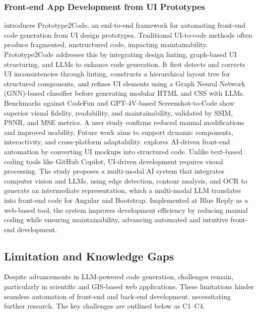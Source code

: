 \subsubsection{Front-end App Development from UI Prototypes}
\citet{xiao2024prototype2code} introduces Prototype2Code, an end-to-end framework for automating front-end code generation from UI design prototypes. Traditional UI-to-code methods often produce fragmented, unstructured code, impacting maintainability. Prototype2Code addresses this by integrating design linting, graph-based UI structuring, and LLMs to enhance code generation. It first detects and corrects UI inconsistencies through linting, constructs a hierarchical layout tree for structured components, and refines UI elements using a Graph Neural Network (GNN)-based classifier before generating modular HTML and CSS with LLMs. Benchmarks against CodeFun and GPT-4V-based Screenshot-to-Code show superior visual fidelity, readability, and maintainability, validated by SSIM, PSNR, and MSE metrics. A user study confirms reduced manual modifications and improved usability. Future work aims to support dynamic components, interactivity, and cross-platform adaptability. \citet{manuardi2024images} explores AI-driven front-end automation by converting UI mockups into structured code. Unlike text-based coding tools like GitHub Copilot, UI-driven development requires visual processing. The study proposes a multi-modal AI system that integrates computer vision and LLMs, using edge detection, contour analysis, and OCR to generate an intermediate representation, which a multi-modal LLM translates into front-end code for Angular and Bootstrap. Implemented at Blue Reply as a web-based tool, the system improves development efficiency by reducing manual coding while ensuring maintainability, advancing automated and intuitive front-end development.

\subsection{Limitation and Knowledge Gaps}
Despite advancements in LLM-powered code generation, challenges remain, particularly in scientific and GIS-based web applications. These limitations hinder seamless automation of front-end and back-end development, necessitating further research. The key challenges are outlined below as C1–C4.

